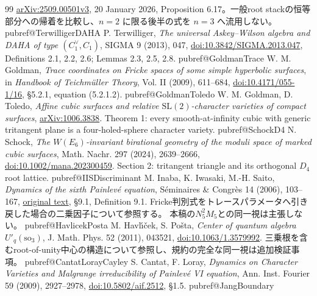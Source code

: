 \begin{thebibliography}{99}
\href{https://arxiv.org/abs/2509.00501v3}{arXiv:2509.00501v3}, 20 January 2026,
Proposition 6.17。一般root stackの恒等部分への帰着を比較し、$n=2$ に限る後半の式を $n=3$ へ流用しない。
\fi
\ifcsname pubref@TerwilligerDAHA\endcsname
{} P. Terwilliger,
\emph{The universal Askey--Wilson algebra and DAHA of type $(C_1^\vee,C_1)$},
SIGMA 9 (2013), 047, \href{https://doi.org/10.3842/SIGMA.2013.047}{doi:10.3842/SIGMA.2013.047},
Definitions 2.1, 2.2, 2.6; Lemmas 2.3, 2.5, 2.8.
\fi
\ifcsname pubref@GoldmanTrace\endcsname
{} W. M. Goldman,
\emph{Trace coordinates on Fricke spaces of some simple hyperbolic surfaces},
in \emph{Handbook of Teichm\"uller Theory}, Vol. II (2009), 611--684,
\href{https://doi.org/10.4171/055-1/16}{doi:10.4171/055-1/16},
\S5.2.1, equation (5.2.1.2).
\fi
\ifcsname pubref@GoldmanToledo\endcsname
{} W. M. Goldman, D. Toledo,
\emph{Affine cubic surfaces and relative $\mathrm{SL}(2)$-character varieties of compact surfaces},
\href{https://arxiv.org/abs/1006.3838}{arXiv:1006.3838}.
Theorem 1: every smooth-at-infinity cubic with generic tritangent plane is a four-holed-sphere character variety.
\fi
\ifcsname pubref@SchockD4\endcsname
{} N. Schock,
\emph{The $W(E_6)$-invariant birational geometry of the moduli space of marked cubic surfaces},
Math. Nachr. 297 (2024), 2639--2666,
\href{https://doi.org/10.1002/mana.202300459}{doi:10.1002/mana.202300459}.
Section 2: tritangent triangle and its orthogonal $D_4$ root lattice.
\fi
\ifcsname pubref@IISDiscriminant\endcsname
{} M. Inaba, K. Iwasaki, M.-H. Saito,
\emph{Dynamics of the sixth Painlev\'e equation},
S\'eminaires \& Congr\`es 14 (2006), 103--167,
\href{https://emis.de/ft/47232}{original text}, \S9.1, Definition 9.1.
Fricke判別式をトレースパラメータへ引き戻した場合の二乗因子について参照する。
本稿の$N_5^2M_5$との同一視は主張しない。
\fi
\ifcsname pubref@HavlicekPosta\endcsname
{} M. Havl\'{\i}\v{c}ek, S. Po\v{s}ta,
\emph{Center of quantum algebra $U'_q(\mathrm{so}_3)$},
J. Math. Phys. 52 (2011), 043521,
\href{https://doi.org/10.1063/1.3579992}{doi:10.1063/1.3579992}.
三乗根を含むroot-of-unity中心の構造について参照し、規約の完全な同一視は追加検証事項。
\fi
\ifcsname pubref@CantatLorayCayley\endcsname
{} S. Cantat, F. Loray,
\emph{Dynamics on Character Varieties and Malgrange irreducibility of Painlev\'e VI equation},
Ann. Inst. Fourier 59 (2009), 2927--2978,
\href{https://doi.org/10.5802/aif.2512}{doi:10.5802/aif.2512}, \S1.5.
\fi
\ifcsname pubref@JangBoundary\endcsname

\end{thebibliography}
